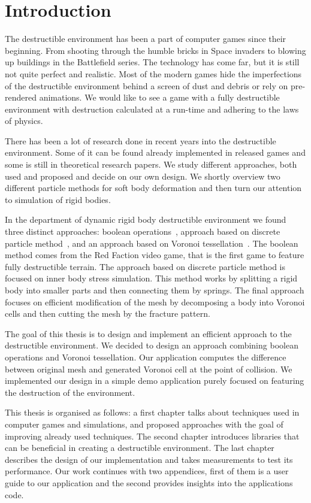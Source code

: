 \chapter*{Introduction}

The destructible environment has been a part of computer games since their beginning. From shooting through the humble bricks in Space invaders to blowing up buildings in the Battlefield series. The technology has come far, but it is still not quite perfect and realistic. Most of the modern games hide the imperfections of the destructible environment behind a screen of dust and debris or rely on pre-rendered animations. We would like to see a game with a fully destructible environment with destruction calculated at a run-time and adhering to the laws of physics.

There has been a lot of research done in recent years into the destructible environment. Some of it can be found already implemented in released games and some is still in theoretical research papers. We study different approaches, both used and proposed and decide on our own design. We shortly overview two different particle methods for soft body deformation and then turn our attention to simulation of rigid bodies. 

In the department of dynamic rigid body destructible environment we found three distinct approaches: boolean operations~\cite{geomod}, approach based on discrete particle method~\cite{edem}, and an approach based on Voronoi tessellation~\cite{nvidia}. The boolean method comes from the Red Faction video game, that is the first game to feature fully destructible terrain. The approach based on discrete particle method is focused on inner body stress simulation. This method works by splitting a rigid body into smaller parts and then connecting them by springs. The final approach focuses on efficient modification of the mesh by decomposing a body into Voronoi cells and then cutting the mesh by the fracture pattern.

The goal of this thesis is to design and implement an efficient approach to the destructible environment. We decided to design an approach combining boolean operations and Voronoi tessellation. Our application computes the difference between original mesh and generated Voronoi cell at the point of collision. We implemented our design in a simple demo application purely focused on featuring the destruction of the environment.

This thesis is organised as follows: a first chapter talks about techniques used in computer games and simulations, and proposed approaches with the goal of improving already used techniques. The second chapter introduces libraries that can be beneficial in creating a destructible environment. The last chapter describes the design of our implementation and takes measurements to test its performance. Our work continues with two appendices, first of them is a user guide to our application and the second provides insights into the applications code. 

